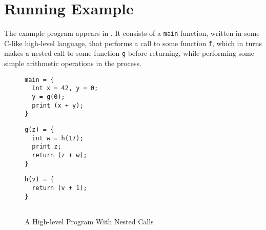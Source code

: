 \documentclass[acmsmall,review,anonymous]{acmart}\settopmatter{printfolios=true,printccs=false,printacmref=false}
\begin{document}
\section{Running Example}
\label{sec:running-example}


The example program appears in . It consists
of a {\tt main} function, written in some C-like high-level language,
that performs a call to some function {\tt f}, which in turns makes a
nested call to some function {\tt g} before returning, while
performing some simple arithmetic operations in the process.

\begin{figure}[b]
\hfill
    \begin{minipage}{.3\textwidth}
\begin{verbatim}
main = {
  int x = 42, y = 0;
  y = g(0);
  print (x + y);
}
\end{verbatim}
    \end{minipage}
    \begin{minipage}{.3\textwidth}
\begin{verbatim}
g(z) = {
  int w = h(17);
  print z;
  return (z + w);
}
\end{verbatim}
    \end{minipage}
    \begin{minipage}{.3\textwidth}
\begin{verbatim}
h(v) = {
  return (v + 1);
}


\end{verbatim}
    \end{minipage}
\caption{A High-level Program With Nested Calls}
\label{fig:running-program}
\end{figure}


\newcommand*{\add}{\textsc{add}}
\newcommand*{\addi}{\textsc{addi}}
\newcommand*{\sw}{\textsc{sw}}
\newcommand*{\lw}{\textsc{lw}}
\newcommand*{\jal}{\textsc{jal}}
\newcommand*{\jalr}{\textsc{jalr}}
\newcommand*{\rsp}{\textsc{sp}}
\newcommand*{\rra}{\textsc{ra}}
\newcommand*{\rout}{\textsc{out}}

\newcommand*{\tagInstr}{\textsc{instr}}
\newcommand*{\tagCall}{\textsc{call}}
\newcommand*{\tagHa}{\textsc{h1}}
\newcommand*{\tagHb}{\textsc{h2}}
\newcommand*{\tagRa}{\textsc{r1}}
\newcommand*{\tagRb}{\textsc{r2}}
\newcommand*{\tagRc}{\textsc{r3}}
\newcommand*{\tagNoDepth}{\textsc{unused}}
\newcommand*{\tagStackDepth}[1]{\textsc{stack} ~ #1}
\newcommand*{\tagPCDepth}[1]{\textsc{pc} ~ #1}
\newcommand*{\tagSP}{\textsc{sp}}
\end{document}
